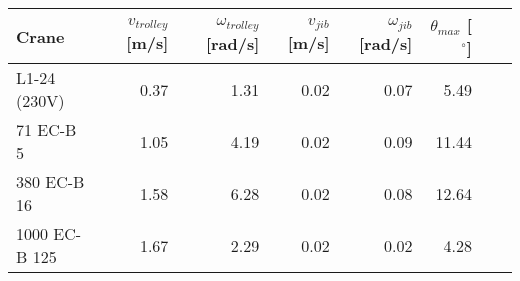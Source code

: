 \documentclass{standalone}
\begin{document}
\begin{tabular}{lrrrrrrr}\toprule
    \textbf{Crane}
        & \textbf{$v_{trolley}$ [m/s]}
        & \textbf{$\omega_{trolley}$ [rad/s]}
        & \textbf{$v_{jib}$ [m/s]}
        & \textbf{$\omega_{jib}$ [rad/s]}
        & \textbf{$\theta_{max}$ [$^\circ$] } \\
    \midrule
    L1-24 (230V) & 0.37 & 1.31 & 0.02 & 0.07 & 5.49 \\
    71 EC-B 5 & 1.05 & 4.19 & 0.02 & 0.09 & 11.44 \\
    380 EC-B 16 & 1.58 & 6.28 & 0.02 & 0.08 & 12.64 \\
    1000 EC-B 125 & 1.67 & 2.29 & 0.02 & 0.02 & 4.28 \\
    \bottomrule
\end{tabular}
\end{document}
